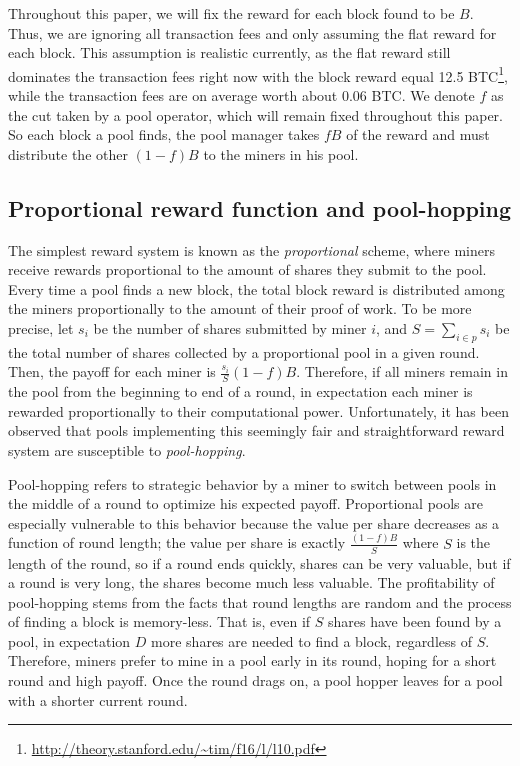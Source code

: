 \documentclass{article}
\theoremstyle{plain}
\theoremstyle{definition}
\begin{document}
Throughout this paper, we will fix the reward for each block found to be $B$. Thus, we are ignoring all transaction fees and only assuming the flat reward for each block. This assumption is realistic currently, as the flat reward still dominates the transaction fees right now with the block reward equal 12.5 BTC\footnote{\url{http://theory.stanford.edu/~tim/f16/l/l10.pdf}}, while the transaction fees are on average worth about 0.06 BTC. We denote $f$ as the cut taken by a pool operator, which will remain fixed throughout this paper. So each block a pool finds, the pool manager takes $fB$ of the reward and must distribute the other $(1-f)B$ to the miners in his pool.

\subsection{Proportional reward function and pool-hopping}

The simplest reward system is known as the \emph{proportional} scheme, 
where miners receive rewards proportional to the amount of shares they
submit to the pool. Every time a pool finds a new block, the total block
reward is distributed among the miners proportionally to the amount of their 
proof of work. To be more precise, let $s_i$ be the number of shares 
submitted by miner $i$, and $S = \sum_{i\in p} s_i$ be the total number of 
shares collected by a proportional pool in a given round. Then, the payoff 
for each miner is $\frac{s_i}{S} (1-f)B$. Therefore, if all miners remain in 
the pool from the beginning to end of a round, in expectation each miner is 
rewarded proportionally to their computational power. Unfortunately, it has been observed that pools implementing this seemingly fair and straightforward reward system are susceptible to \emph{pool-hopping}. 

Pool-hopping refers to strategic behavior by a miner to switch between pools in the middle of a round to optimize his expected payoff. Proportional pools are especially vulnerable to this behavior because the value per share decreases as a function of round length; the value per share is exactly $\frac{(1-f)B}{S}$ where $S$ is the length of the round, so if a round ends quickly, shares can be very valuable, but if a round is very long, the shares become much less valuable. The profitability of pool-hopping stems from the facts that round lengths are random and the process of finding a block is memory-less. That is, even if $S$ shares have been found by a pool, in expectation $D$ more shares are needed to find a block, regardless of $S$. Therefore, miners prefer to mine in a pool early in its round, hoping for a short round and high payoff. Once the round drags on, a pool hopper leaves for a pool with a shorter current round.
\end{document}
